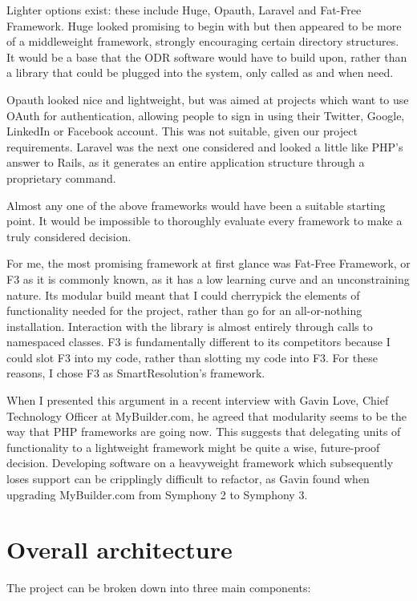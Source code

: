 Lighter options exist: these include Huge, Opauth, Laravel and Fat-Free Framework. Huge looked promising to begin with but then appeared to be more of a middleweight framework, strongly encouraging certain directory structures. It would be a base that the ODR software would have to build upon, rather than a library that could be plugged into the system, only called as and when need.

Opauth looked nice and lightweight, but was aimed at projects which want to use OAuth for authentication, allowing people to sign in using their Twitter, Google, LinkedIn or Facebook account. This was not suitable, given our project requirements. Laravel was the next one considered and looked a little like PHP's answer to Rails, as it generates an entire application structure through a proprietary command.

Almost any one of the above frameworks would have been a suitable starting point. It would be impossible to thoroughly evaluate every framework to make a truly considered decision.

For me, the most promising framework at first glance was Fat-Free Framework, or F3 as it is commonly known, as it has a low learning curve and an unconstraining nature. Its modular build meant that I could cherrypick the elements of functionality needed for the project, rather than go for an all-or-nothing installation. Interaction with the library is almost entirely through calls to namespaced classes. F3 is fundamentally different to its competitors because I could slot F3 into my code, rather than slotting my code into F3. For these reasons, I chose F3 as SmartResolution's framework.

When I presented this argument in a recent interview with Gavin Love, Chief Technology Officer at MyBuilder.com, he agreed that modularity seems to be the way that PHP frameworks are going now. This suggests that delegating units of functionality to a lightweight framework might be quite a wise, future-proof decision. Developing software on a heavyweight framework which subsequently loses support can be cripplingly difficult to refactor, as Gavin found when upgrading MyBuilder.com from Symphony 2 to Symphony 3.

\section{Overall architecture}

The project can be broken down into three main components:

